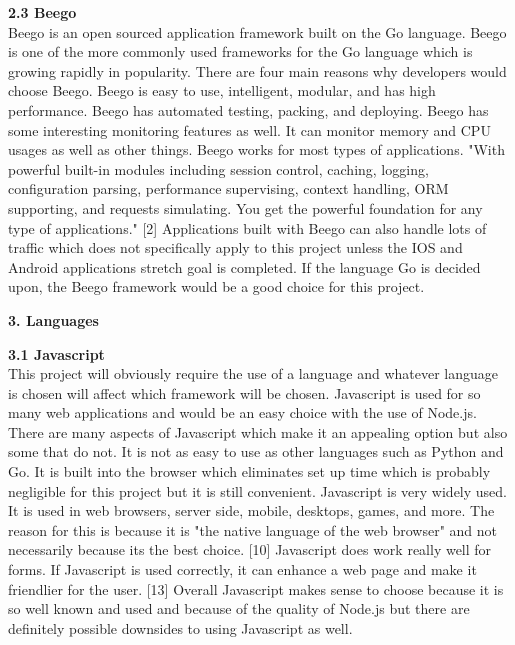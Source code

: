 \documentclass[letterpaper,10pt,draftclsnofoot,onecolumn,]{IEEEtran}
\begin{document}
\textbf{2.3 Beego}\\
Beego is an open sourced application framework built on the Go language. Beego is one of the more commonly used frameworks for the Go language which is growing rapidly in popularity. There are four main reasons why developers would choose Beego. Beego is easy to use, intelligent, modular, and has high performance. Beego has automated testing, packing, and deploying. Beego has some interesting monitoring features as well. It can monitor memory and CPU usages as well as other things. Beego works for most types of applications. "With powerful built-in modules including session control, caching, logging, configuration parsing, performance supervising, context handling, ORM supporting, and requests simulating. You get the powerful foundation for any type of applications." [2] Applications built with Beego can also handle lots of traffic which does not specifically apply to this project unless the IOS and Android applications stretch goal is completed. If the language Go is decided upon, the Beego framework would be a good choice for this project.\\

\begin{center}
\textbf{3. Languages}\\
\end{center}

\textbf{3.1 Javascript}\\
This project will obviously require the use of a language and whatever language is chosen will affect which framework will be chosen. Javascript is used for so many web applications and would be an easy choice with the use of Node.js. There are many aspects of Javascript which make it an appealing option but also some that do not. It is not as easy to use as other languages such as Python and Go. It is built into the browser which eliminates set up time which is probably negligible for this project but it is still convenient. Javascript is very widely used. It is used in web browsers, server side, mobile, desktops, games, and more. The reason for this is because it is "the native language of the web browser" and not necessarily because its the best choice. [10] Javascript does work really well for forms. If Javascript is used correctly, it can enhance a web page and make it friendlier for the user. [13] Overall Javascript makes sense to choose because it is so well known and used and because of the quality of Node.js but there are definitely possible downsides to using Javascript as well.\\
\end{document}
